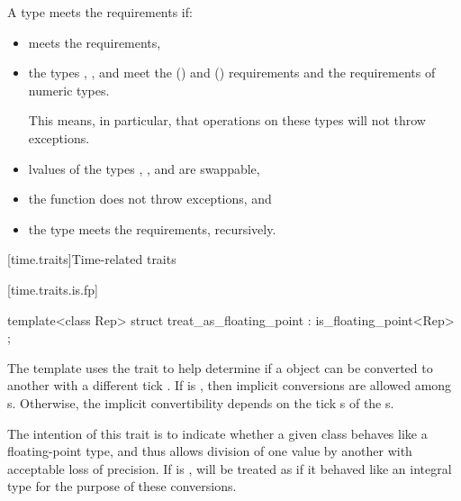 \pnum
A type  meets the  requirements if:
\begin{itemize}
\item {} meets the  requirements,

\item the types , , and 
meet the  () and
 ()
requirements and the requirements of
numeric types.
\begin{note}
This means, in particular,
that operations on these types will not throw exceptions.
\end{note}

\item lvalues of the types , , and
 are swappable,

\item the function  does not throw exceptions, and

\item the type  meets the 
requirements, recursively.
\end{itemize}

[time.traits]{Time-related traits}

[time.traits.is.fp]{}

%
\begin{itemdecl}
template<class Rep> struct treat_as_floating_point : is_floating_point<Rep> { };
\end{itemdecl}

\pnum
The  template uses the  trait to
help determine if a  object can be converted to another
 with a different tick . If
 is , then implicit conversions
are allowed among s. Otherwise, the implicit convertibility
depends on the tick s of the s.
\begin{note}
The intention of this trait is to indicate whether a given class behaves like a floating-point
type, and thus allows division of one value by another with acceptable loss of precision. If
 is ,  will be treated as
if it behaved like an integral type for the purpose of these conversions.
\end{note}

